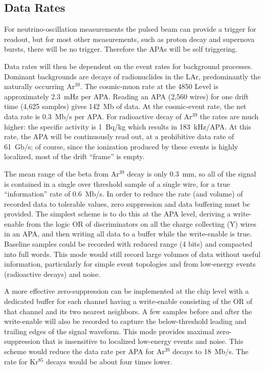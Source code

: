 \subsection{Data Rates}

For neutrino-oscillation measurements the pulsed beam can provide a
trigger for readout, but for most other measurements, such as proton decay
and supernova bursts, there will be no trigger.  Therefore the APAs will be
self triggering.  

Data rates will then
be dependent on the event rates for background processes.  Dominant
backgrounds are decays of radionuclides in the LAr,
predominantly the naturally occurring Ar$^{39}$.  The cosmic-muon rate at the 4850 Level is approximately 2.3~mHz per APA.  Reading an APA (2,560 wires) for
one drift time (4,625 samples) gives 142~Mb of data. At the cosmic-event rate,
the net data rate is 0.3~Mb/s per APA.  For radioactive decay of Ar$^{39}$
the rates are much higher: the specific activity is 1~Bq/kg which results in 183~kHz/APA.
At this rate, the APA will be continuously read out, at a prohibitive data
rate of 61~Gb/s; of course, since the ionization produced by these events is highly localized,
most of the drift ``frame'' is empty.

The mean range of the beta from Ar$^{39}$ decay is only 0.3~mm, so all
of the signal is contained in a single over threshold sample of a single wire, for a true ``information''
rate of 0.6~Mb/s. In order to
reduce the rate (and volume) of recorded data to tolerable values, 
zero suppression and data buffering must be
provided.  The simplest scheme is to do this at the APA level, deriving
a write-enable from the logic OR of discriminators on all the charge
collecting (Y) wires in an APA, and then writing all data to a buffer
while the write-enable is true.  Baseline samples could be recorded
with reduced range (4 bits) and compacted into full words.  This mode
would still record large volumes of data without useful
information, particularly for simple event topologies and from low-energy 
events (radioactive decays) and noise. 

A more effective
zero-suppression can be implemented at the chip level with a dedicated buffer for each
channel having a write-enable consisting of the OR of  that channel and
its two nearest neighbors.  A few samples before and after the write-enable 
will also be recorded to capture the below-threshold leading
and trailing edges of the signal waveform.  This mode provides maximal
zero-suppression that is insensitive to localized low-energy events
and noise. This scheme would reduce the data rate per APA for Ar$^{39}$ decays to
18~Mb/s. The rate for Kr$^{85}$ decays would be about four times lower.


